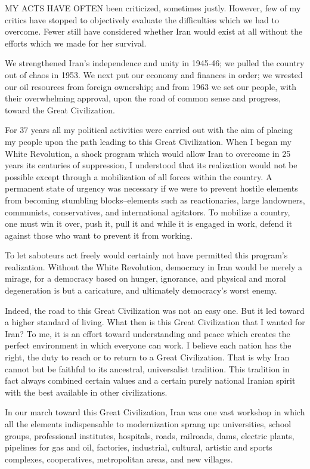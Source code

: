 MY ACTS HAVE OFTEN been criticized, sometimes justly. However, few of my critics have stopped to objectively evaluate the difficulties which we had to overcome. Fewer still have considered whether Iran would exist at all without the efforts which we made for her survival. 

We strengthened Iran's independence and unity in 1945-46; we pulled the country out of chaos in 1953. We next put our economy and finances in order; we wrested our oil resources from foreign ownership; and from 1963 we set our people, with their overwhelming approval, upon the road of common sense and progress, toward the Great Civilization. 

For 37 years all my political activities were carried out with the aim of placing my people upon the path leading to this Great Civilization. When I began my White Revolution, a shock program which would allow Iran to overcome in 25 years its centuries of suppression, I understood that its realization would not be possible except through a mobilization of all forces within the country. A permanent state of urgency was necessary if we were to prevent hostile elements from becoming stumbling blocks--elements such as reactionaries, large landowners, communists, conservatives, and international agitators. To mobilize a country, one must win it over, push it, pull it and while it is engaged in work, defend it against those who want to prevent it from working. 



To let saboteurs act freely would certainly not have permitted this program's realization. Without the White Revolution, democracy in Iran would be merely a mirage, for a democracy based on hunger, ignorance, and physical and moral degeneration is but a caricature, and ultimately democracy's worst enemy. 

Indeed, the road to this Great Civilization was not an easy one. But it led toward a higher standard of living. What then is this Great Civilization that I wanted for Iran? To me, it is an effort toward understanding and peace which creates the perfect environment in which everyone can work. I believe each nation has the right, the duty to reach or to return to a Great Civilization. That is why Iran cannot but be faithful to its ancestral, universalist tradition. This tradition in fact always combined certain values and a certain purely national Iranian spirit with the best available in other civilizations. 

In our march toward this Great Civilization, Iran was one vast workshop in which all the elements indispensable to modernization sprang up: universities, school groups, professional institutes, hospitals, roads, railroads, dams, electric plants, pipelines for gas and oil, factories, industrial, cultural, artistic and sports complexes, cooperatives, metropolitan areas, and new villages. 

